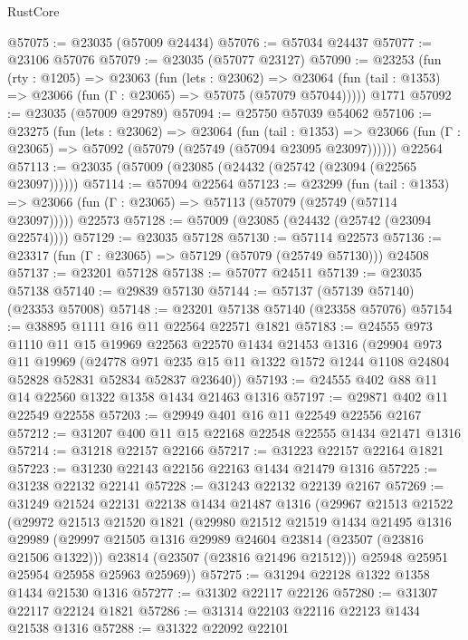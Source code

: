\begin{lexlean}{RustCore}
\begin{coremodule}
@57075 := @23035 (@57009 @24434)
@57076 := @57034 @24437
@57077 := @23106 @57076
@57079 := @23035 (@57077 @23127)
@57090 := @23253
    (fun (rty : @1205) =>
    @23063
      (fun (lets : @23062) =>
      @23064 (fun (tail : @1353) => @23066 (fun (Γ : @23065) => @57075 (@57079 @57044)))))
    @1771
@57092 := @23035 (@57009 @29789)
@57094 := @25750 @57039 @54062
@57106 := @23275
    (fun (lets : @23062) =>
    @23064
      (fun (tail : @1353) =>
      @23066 (fun (Γ : @23065) => @57092 (@57079 (@25749 (@57094 @23095 @23097))))))
    @22564
@57113 := @23035 (@57009 (@23085 (@24432 (@25742 (@23094 (@22565 @23097))))))
@57114 := @57094 @22564
@57123 := @23299
    (fun (tail : @1353) => @23066 (fun (Γ : @23065) => @57113 (@57079 (@25749 (@57114 @23097)))))
    @22573
@57128 := @57009 (@23085 (@24432 (@25742 (@23094 @22574))))
@57129 := @23035 @57128
@57130 := @57114 @22573
@57136 := @23317 (fun (Γ : @23065) => @57129 (@57079 (@25749 @57130))) @24508
@57137 := @23201 @57128
@57138 := @57077 @24511
@57139 := @23035 @57138
@57140 := @29839 @57130
@57144 := @57137 (@57139 @57140) (@23353 @57008)
@57148 := @23201 @57138 @57140 (@23358 @57076)
@57154 := @38895 @1111 @16 @11 @22564 @22571 @1821
@57183 := @24555
    @973
    @1110
    @11
    @15
    @19969
    @22563
    @22570
    @1434
    @21453
    @1316
    (@29904
      @973
      @11
      @19969
      (@24778 @971 @235 @15 @11 @1322 @1572 @1244 @1108 @24804 @52828 @52831 @52834 @52837 @23640))
@57193 := @24555 @402 @88 @11 @14 @22560 @1322 @1358 @1434 @21463 @1316
@57197 := @29871 @402 @11 @22549 @22558
@57203 := @29949 @401 @16 @11 @22549 @22556 @2167
@57212 := @31207 @400 @11 @15 @22168 @22548 @22555 @1434 @21471 @1316
@57214 := @31218 @22157 @22166
@57217 := @31223 @22157 @22164 @1821
@57223 := @31230 @22143 @22156 @22163 @1434 @21479 @1316
@57225 := @31238 @22132 @22141
@57228 := @31243 @22132 @22139 @2167
@57269 := @31249
    @21524
    @22131
    @22138
    @1434
    @21487
    @1316
    (@29967
      @21513
      @21522
      (@29972
        @21513
        @21520
        @1821
        (@29980
          @21512
          @21519
          @1434
          @21495
          @1316
          @29989
          (@29997 @21505 @1316 @29989 @24604 @23814 (@23507 (@23816 @21506 @1322)))
          @23814
          (@23507 (@23816 @21496 @21512)))
        @25948
        @25951
        @25954
        @25958
        @25963
        @25969))
@57275 := @31294 @22128 @1322 @1358 @1434 @21530 @1316
@57277 := @31302 @22117 @22126
@57280 := @31307 @22117 @22124 @1821
@57286 := @31314 @22103 @22116 @22123 @1434 @21538 @1316
@57288 := @31322 @22092 @22101

\end{coremodule}
\end{lexlean}
